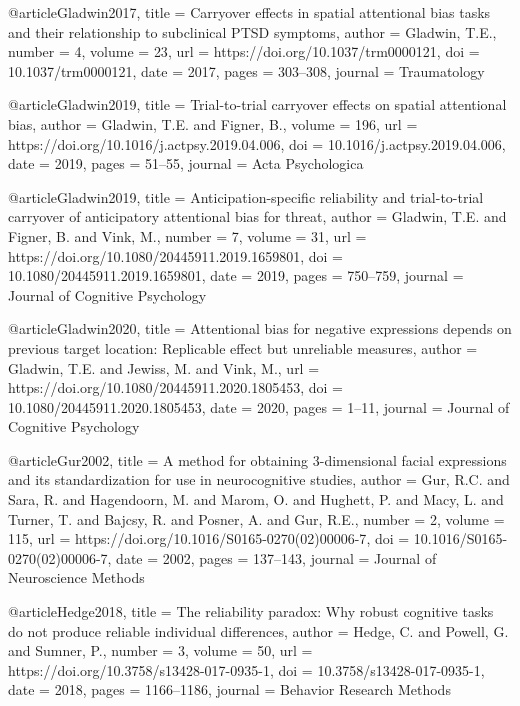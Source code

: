 @article{Gladwin2017,
    title       = {Carryover effects in spatial attentional bias tasks and their relationship to subclinical PTSD symptoms},
    author      = {Gladwin, T.E.},
    number      = {4},
    volume      = {23},
    url         = {https://doi.org/10.1037/trm0000121},
    doi         = {10.1037/trm0000121},
    date        = {2017},
    pages       = {303–308},
    journal     = {Traumatology}
}


@article{Gladwin2019,
    title       = {Trial-to-trial carryover effects on spatial attentional bias},
    author      = {Gladwin, T.E. and Figner, B.},
    volume      = {196},
    url         = {https://doi.org/10.1016/j.actpsy.2019.04.006},
    doi         = {10.1016/j.actpsy.2019.04.006},
    date        = {2019},
    pages       = {51–55},
    journal     = {Acta Psychologica}
}


@article{Gladwin2019,
    title       = {Anticipation-specific reliability and trial-to-trial carryover of anticipatory attentional bias for threat},
    author      = {Gladwin, T.E. and Figner, B. and Vink, M.},
    number      = {7},
    volume      = {31},
    url         = {https://doi.org/10.1080/20445911.2019.1659801},
    doi         = {10.1080/20445911.2019.1659801},
    date        = {2019},
    pages       = {750–759},
    journal     = {Journal of Cognitive Psychology}
}


@article{Gladwin2020,
    title       = {Attentional bias for negative expressions depends on previous target location: Replicable effect but unreliable measures},
    author      = {Gladwin, T.E. and Jewiss, M. and Vink, M.},
    url         = {https://doi.org/10.1080/20445911.2020.1805453},
    doi         = {10.1080/20445911.2020.1805453},
    date        = {2020},
    pages       = {1–11},
    journal     = {Journal of Cognitive Psychology}
}


@article{Gur2002,
    title       = {A method for obtaining 3-dimensional facial expressions and its standardization for use in neurocognitive studies},
    author      = {Gur, R.C. and Sara, R. and Hagendoorn, M. and Marom, O. and Hughett, P. and Macy, L. and Turner, T. and Bajcsy, R. and Posner, A. and Gur, R.E.},
    number      = {2},
    volume      = {115},
    url         = {https://doi.org/10.1016/S0165-0270(02)00006-7},
    doi         = {10.1016/S0165-0270(02)00006-7},
    date        = {2002},
    pages       = {137–143},
    journal     = {Journal of Neuroscience Methods}
}


@article{Hedge2018,
    title       = {The reliability paradox: Why robust cognitive tasks do not produce reliable individual differences},
    author      = {Hedge, C. and Powell, G. and Sumner, P.},
    number      = {3},
    volume      = {50},
    url         = {https://doi.org/10.3758/s13428-017-0935-1},
    doi         = {10.3758/s13428-017-0935-1},
    date        = {2018},
    pages       = {1166–1186},
    journal     = {Behavior Research Methods}
}


